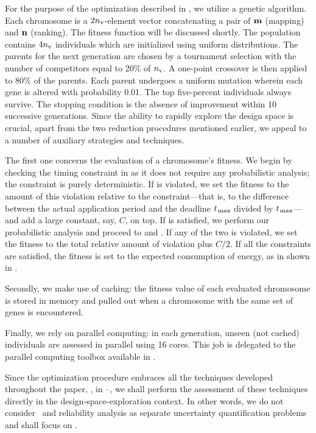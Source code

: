 For the purpose of the optimization described in , we utilize a genetic algorithm.
Each chromosome is a $2 {n_\text{v}}$-element vector concatenating a pair of $\mathbf{m}$ (mapping) and $\mathbf{n}$ (ranking).
The fitness function will be discussed shortly.
The population contains $4 {n_\text{v}}$ individuals which are initialized using uniform distributions.
The parents for the next generation are chosen by a tournament selection with the number of competitors equal to 20\% of ${n_\text{v}}$.
A one-point crossover is then applied to 80\% of the parents.
Each parent undergoes a uniform mutation wherein each gene is altered with probability 0.01.
The top five-percent individuals always survive.
The stopping condition is the absence of improvement within 10 successive generations.
Since the ability to rapidly explore the design space is crucial, apart from the two reduction procedures mentioned earlier, we appeal to a number of auxiliary strategies and techniques.

The first one concerns the evaluation of a chromosome's fitness.
We begin by checking the timing constraint in  as it does not require any probabilistic analysis; the constraint is purely deterministic.
If  is violated, we set the fitness to the amount of this violation relative to the constraint---that is, to the difference between the actual application period and the deadline $t_{\text{\kern0.1emmax}}$ divided by $t_{\text{\kern0.1emmax}}$---and add a large constant, say, $C$, on top.
If  is satisfied, we perform our probabilistic analysis and proceed to  and .
If any of the two is violated, we set the fitness to the total relative amount of violation plus $C/2$.
If all the constraints are satisfied, the fitness is set to the expected consumption of energy, as in shown in .

Secondly, we make use of caching: the fitness value of each evaluated chromosome is stored in memory and pulled out when a chromosome with the same set of genes is encountered.

Finally, we rely on parallel computing: in each generation, unseen (not cached) individuals are assessed in parallel using 16  cores.
This job is delegated to the parallel computing toolbox available in  \cite{matlab}.

Since the optimization procedure embraces all the techniques developed throughout the paper, \ie, in --, we shall perform the assessment of these techniques directly in the design-space-exploration context.
In other words, we do not consider \ta\ and reliability analysis as separate uncertainty quantification problems and shall focus on .
